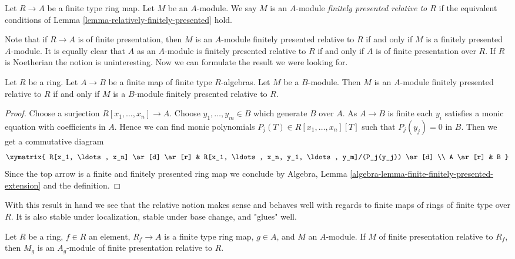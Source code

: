 \begin{definition}
\label{definition-relatively-finitely-presented}
Let $R \to A$ be a finite type ring map. Let $M$ be an $A$-module.
We say $M$ is an $A$-module {\it finitely presented relative to $R$}
if the equivalent conditions of
Lemma \ref{lemma-relatively-finitely-presented}
hold.
\end{definition}

\noindent
Note that if $R \to A$ is of finite presentation, then $M$ is an
$A$-module finitely presented relative to $R$ if and only if $M$
is a finitely presented $A$-module. It is equally clear that $A$ as
an $A$-module is finitely presented relative to $R$ if and only if
$A$ is of finite presentation over $R$. If $R$ is Noetherian the notion
is uninteresting. Now we can formulate the result we were looking for.

\begin{lemma}
\label{lemma-finite-extension}
Let $R$ be a ring. Let $A \to B$ be a finite map of finite type $R$-algebras.
Let $M$ be a $B$-module. Then
$M$ is an $A$-module finitely presented relative to $R$
if and only if
$M$ is a $B$-module finitely presented relative to $R$.
\end{lemma}

\begin{proof}
Choose a surjection $R[x_1, \ldots, x_n] \to A$.
Choose $y_1, \ldots, y_m \in B$ which generate $B$ over $A$.
As $A \to B$ is finite each $y_i$ satisfies a monic equation with
coefficients in $A$. Hence we can find monic polynomials
$P_j(T) \in R[x_1, \ldots, x_n][T]$ such that $P_j(y_j) = 0$ in $B$.
Then we get a commutative diagram
$$
\xymatrix{
R[x_1, \ldots, x_n] \ar[d] \ar[r] &
R[x_1, \ldots, x_n, y_1, \ldots, y_m]/(P_j(y_j)) \ar[d] \\
A \ar[r] & B
}
$$
Since the top arrow is a finite and finitely presented ring map
we conclude by
Algebra, Lemma \ref{algebra-lemma-finite-finitely-presented-extension}
and the definition.
\end{proof}

\noindent
With this result in hand we see that the relative notion makes sense
and behaves well with regards to finite maps of rings of finite type
over $R$. It is also stable under localization, stable under
base change, and "glues" well.

\begin{lemma}
\label{lemma-localize-relative-finite-presentation}
Let $R$ be a ring, $f \in R$ an element, $R_f \to A$ is a finite type ring map,
$g \in A$, and $M$ an $A$-module. If $M$ of finite presentation relative
to $R_f$, then $M_g$ is an $A_g$-module of finite presentation relative
to $R$.
\end{lemma}


